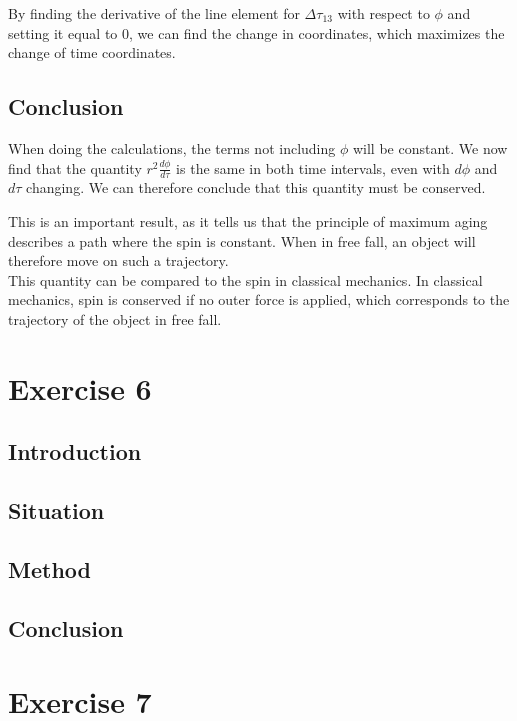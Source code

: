 \documentclass[reprint,english,notitlepage]{revtex4-2}
\begin{document}
        By finding the derivative of the line element for $\Delta \tau_{13}$ with respect to $\phi$ and setting it equal to 0, we can find the change in coordinates, which maximizes the change of time coordinates.

    \subsection{Conclusion}\label{subsec:conclusion2}
        When doing the calculations, the terms not including $\phi$ will be constant.
        We now find that the quantity $r^2 \frac{d\phi}{d\tau}$ is the same in both time intervals, even with $d\phi$ and $d\tau$ changing.
        We can therefore conclude that this quantity must be conserved.

        This is an important result, as it tells us that the principle of maximum aging describes a path where the spin is constant.
        When in free fall, an object will therefore move on such a trajectory.\\

        This quantity can be compared to the spin in classical mechanics.
        In classical mechanics, spin is conserved if no outer force is applied, which corresponds to the trajectory of the object in free fall.




\section{Exercise 6}\label{sec:exercise-6}
    \subsection{Introduction}\label{subsec:introduction6}
    \subsection{Situation}\label{subsec:situation6}
    \subsection{Method}\label{subsec:method6}
    \subsection{Conclusion}\label{subsec:conclusion6}


\newpage
\section{Exercise 7}\label{sec:exercise-7}
\end{document}
